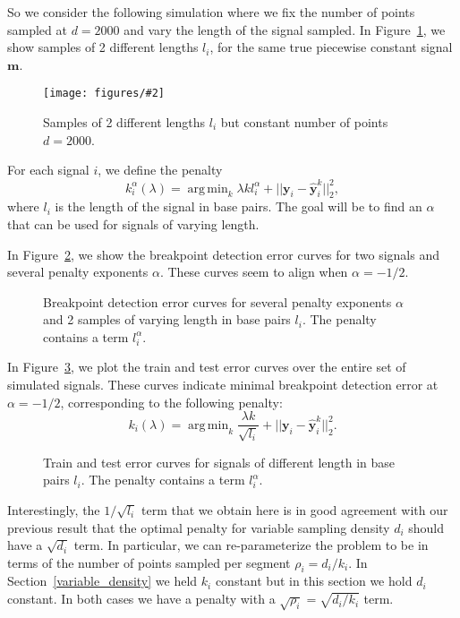 \documentclass{jsfds} %
\newcommand{\fig}[3][H]{
  \begin{figure}[#1]
    \hskip -1cm
    
    \caption{#3}
    \label{fig:#2}
  \end{figure}
}
\newcommand{\figpdf}[3][H]{
  \begin{figure}[#1]
    \hskip -1cm
    \texttt{[image: figures/\#2]}
    \caption{#3}
    \label{fig:#2}
  \end{figure}
}
\DeclareMathOperator*{\argmin}{arg\,min}
\begin{document}
So we consider the following simulation where we fix the number of
points sampled at $d=2000$ and vary the length of the signal
sampled. In Figure~\ref{fig:variable-breaks-constant-size}, we show
samples of 2 different lengths $l_i$, for the same true piecewise constant signal
$\mathbf m$.

\figpdf{variable-breaks-constant-size}{Samples of 2 different lengths
  $l_i$ but constant number of points $d=2000$.}

\newpage

For each signal $i$, we define the penalty
\begin{equation}
  \label{eq:kstar_length}
  k_i^\alpha(\lambda) = \argmin_k \lambda k l_i^\alpha 
+ ||\mathbf y_i - \mathbf{\hat y}_i^k||^2_2,
\end{equation}
where $l_i$ is the length of the signal in base pairs. The goal will
be to find an $\alpha$ that can be used for signals of varying length.


In Figure~\ref{fig:variable-breaks-constant-size-berr}, we show
the breakpoint detection error curves for two signals and several
penalty exponents $\alpha$.
These curves seem to align when $\alpha=-1/2$.

\fig{variable-breaks-constant-size-berr}{Breakpoint detection error
  curves for several penalty exponents $\alpha$ and 2 samples of
  varying length in base pairs $l_i$. The penalty contains a term
  $l_i^\alpha$.}

\newpage

In Figure~\ref{fig:variable-breaks-constant-size-alpha}, we plot the
train and test error curves over the entire set of simulated signals.
These curves indicate minimal breakpoint detection error at
$\alpha=-1/2$, corresponding to the following penalty:
\begin{equation}
  \label{eq:kstar_length_opt}
  k_i(\lambda) = \argmin_k \frac{\lambda k}{\sqrt{l_i}}
  + ||\mathbf y_i-\mathbf{\hat y}_i^k||^2_2.
\end{equation}




\fig{variable-breaks-constant-size-alpha}{Train and test error curves
  for signals of different length in base pairs $l_i$. The penalty
  contains a term
  $l_i^\alpha$.}


Interestingly, the $1/\sqrt{l_i}$ term that we obtain here is in good
agreement with our previous result that the optimal penalty for
variable sampling density $d_i$ should have a $\sqrt{d_i}$ term. In
particular, we can re-parameterize the problem to be in terms of the
number of points sampled per segment $\rho_i=d_i/k_i$. In
Section~\ref{variable_density} we held $k_i$ constant but in this
section we hold $d_i$ constant. In both cases we have a penalty with a
$\sqrt{\rho_i}=\sqrt{d_i/k_i}$ term.
\end{document}
